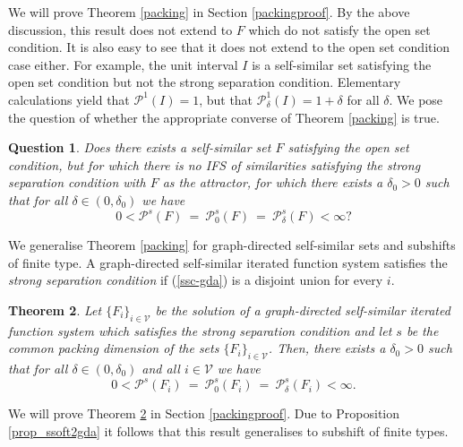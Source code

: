 \documentclass[11pt,english,british]{article}
\numberwithin{equation}{section}
\newtheorem{thm}{Theorem}[section]
\newtheorem{ques}[thm]{Question}
\begin{document}
We will prove Theorem \ref{packing} in Section \ref{packingproof}. By the above discussion, this result does not extend to $F$ which do not satisfy the open set condition. It is also easy to see that it does not extend to the open set condition case either.  For example, the unit interval $I$ is a self-similar set satisfying the open set condition but not the strong separation condition.  Elementary calculations yield that $\mathcal{P}^1(I) = 1$, but that $\mathcal{P}_\delta^1 (I)= 1+\delta$ for all $\delta$.  We pose the question of whether the appropriate converse of Theorem \ref{packing} is true.

\begin{ques}
Does there exists a self-similar set $F$ satisfying the open set condition, but for which there is no IFS of similarities satisfying the strong separation condition with $F$ as the attractor, for which there exists a $\delta_0>0$ such that for all $\delta \in (0, \delta_0)$ we have
\[
0< \mathcal{P}^s (F) \ = \  \mathcal{P}_0^s (F) \ = \ \mathcal{P}_{\delta}^s (F)< \infty?
\]
\end{ques}

We generalise Theorem \ref{packing} for graph-directed self-similar sets and subshifts of finite type. A graph-directed self-similar iterated function system satisfies the \emph{strong separation condition} if (\ref{ssc-gda}) is a disjoint union for every $i$.

\begin{thm} \label{packing-gda}
Let $\{F_{i}\}_{i  \in \mathcal{V}}$ be the solution of a graph-directed self-similar iterated function system which satisfies the strong separation condition and let $s$ be the common packing dimension of the sets $\{F_i\}_{i \in \mathcal{V}}$.  Then, there exists a $\delta_0>0$ such that for all $\delta \in (0, \delta_0)$ and all $i\in \mathcal{V}$ we have
\[
0< \mathcal{P}^s (F_i) \ = \  \mathcal{P}_0^s (F_i) \ = \ \mathcal{P}_{\delta}^s (F_i)< \infty.
\]
\end{thm}

We will prove Theorem \ref{packing-gda} in Section \ref{packingproof}. Due to Proposition \ref{prop_ssoft2gda} it follows that this result generalises to subshift of finite types.
\end{document}
